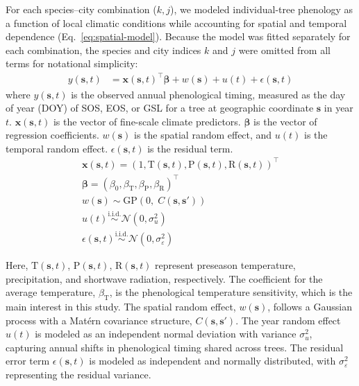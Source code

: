For each species–city combination ($k,j$), we modeled individual-tree phenology as a function of local climatic conditions while accounting for spatial and temporal dependence (Eq.~\ref{eq:spatial-model}). Because the model was fitted separately for each combination, the species and city indices $k$ and $j$ were omitted from all terms for notational simplicity:
\begin{eqnarray}
y(\mathbf{s}, t) &= \mathbf{x}(\mathbf{s},t)^\top \boldsymbol{\beta} + w(\mathbf{s}) + u(t) + \epsilon(\mathbf{s}, t)
\label{eq:spatial-model}
\end{eqnarray}
where $y(\mathbf{s}, t)$ is the observed annual phenological timing, measured as the day of year (DOY) of SOS, EOS, or GSL for a tree at geographic coordinate $\mathbf{s}$ in year $t$. $\mathbf{x}(\mathbf{s}, t)$ is the vector of fine-scale climate predictors. $\boldsymbol{\beta}$ is the vector of regression coefficients. $w(\mathbf{s})$ is the spatial random effect, and $u(t)$ is the temporal random effect. $\epsilon(\mathbf{s}, t)$ is the residual term.
\begin{eqnarray}
\mathbf{x}(\mathbf{s},t) = (1, \text{T}(\mathbf{s},t), \text{P}(\mathbf{s},t), \text{R}(\mathbf{s},t))^\top \\
\boldsymbol{\beta} = (\beta_0, \beta_{\text{T}}, \beta_{\text{P}}, \beta_{\text{R}})^\top \\
w(\mathbf{s}) \sim \text{GP}\!\left(0,\; C(\mathbf{s},\mathbf{s}')\right) \\
u(t) \stackrel{\text{i.i.d.}}{\sim} \mathcal{N}(0,\sigma_u^2) \\
\epsilon(\mathbf{s}, t) \stackrel{\text{i.i.d.}}{\sim} \mathcal{N}(0,\sigma^2_\varepsilon)
\label{eq:spatial-model-terms}
\end{eqnarray}

Here, $\text{T}(\mathbf{s},t)$, $\text{P}(\mathbf{s},t)$, $\text{R}(\mathbf{s},t)$ represent preseason temperature, precipitation, and shortwave radiation, respectively. The coefficient for the average temperature, $\beta_{\text{T}}$, is the phenological temperature sensitivity, which is the main interest in this study. The spatial random effect, $w(\mathbf{s})$, follows a Gaussian process with a Matérn covariance structure, $C(\mathbf{s}, \mathbf{s}')$. The year random effect $u(t)$ is modeled as an independent normal deviation with variance $\sigma_u^2$, capturing annual shifts in phenological timing shared across trees. The residual error term $\epsilon(\mathbf{s}, t)$ is modeled as independent and normally distributed, with $\sigma^2_\varepsilon$ representing the residual variance.

